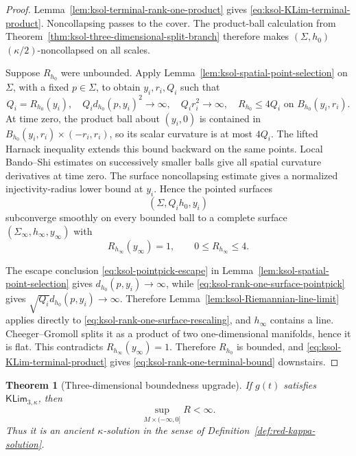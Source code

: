 \documentclass[10pt]{coll-l}
\newtheorem{theorem}{Theorem}[chapter]
\theoremstyle{definition}
\theoremstyle{remark}
\numberwithin{section}{chapter}
\numberwithin{equation}{chapter}
\begin{document}
\begin{proof}
Lemma~\ref{lem:ksol-terminal-rank-one-product} gives
\eqref{eq:ksol-KLim-terminal-product}.  Noncollapsing passes to the cover.
The product-ball
calculation from Theorem~\ref{thm:ksol-three-dimensional-split-branch}
therefore makes $(\Sigma,h_0)$ $(\kappa/2)$-noncollapsed on all scales.

Suppose $R_{h_0}$ were unbounded.  Apply
Lemma~\ref{lem:ksol-spatial-point-selection} on $\Sigma$, with a fixed
$p\in\Sigma$, to obtain $y_i,r_i,Q_i$ such that
\begin{equation}
 Q_i=R_{h_0}(y_i),\quad
 Q_i d_{h_0}(p,y_i)^2\to\infty,\quad
 Q_ir_i^2\to\infty,\quad
 R_{h_0}\leq4Q_i\text{ on }B_{h_0}(y_i,r_i).          \label{eq:ksol-rank-one-surface-pointpick}
\end{equation}
At time zero, the product ball about $(y_i,0)$ is contained in
$B_{h_0}(y_i,r_i)\times(-r_i,r_i)$, so its scalar curvature is at most
$4Q_i$.  The lifted Harnack inequality extends this bound backward on the
same points.  Local Bando--Shi estimates on successively smaller balls give
all spatial curvature derivatives at time zero.  The surface
noncollapsing estimate gives a normalized injectivity-radius lower bound at
$y_i$.  Hence the pointed surfaces
\begin{equation}
                       (\Sigma,Q_i h_0,y_i)            \label{eq:ksol-rank-one-surface-rescaling}
\end{equation}
subconverge smoothly on every bounded ball to a complete surface
$(\Sigma_\infty,h_\infty,y_\infty)$ with
\[
        R_{h_\infty}(y_\infty)=1,\qquad
        0\leq R_{h_\infty}\leq4.
\]

The escape conclusion \eqref{eq:ksol-pointpick-escape} in
Lemma~\ref{lem:ksol-spatial-point-selection} gives
$d_{h_0}(p,y_i)\to\infty$, while
\eqref{eq:ksol-rank-one-surface-pointpick} gives
$\sqrt{Q_i}d_{h_0}(p,y_i)\to\infty$.  Therefore
Lemma~\ref{lem:ksol-Riemannian-line-limit} applies directly to
\eqref{eq:ksol-rank-one-surface-rescaling}, and $h_\infty$ contains a
line.  Cheeger--Gromoll splits it as a product of two one-dimensional
manifolds, hence it is flat.  This contradicts
$R_{h_\infty}(y_\infty)=1$.  Therefore $R_{h_0}$ is bounded, and
\eqref{eq:ksol-KLim-terminal-product} gives
\eqref{eq:ksol-rank-one-terminal-bound} downstairs.
\end{proof}

\begin{theorem}[Three-dimensional boundedness upgrade]
\label{thm:ksol-three-dimensional-KLim-bounded}
If $g(t)$ satisfies $\mathsf{KLim}_{3,\kappa}$, then
\begin{equation}
                    \sup_{M\times(-\infty,0]}R<\infty. \label{eq:ksol-KLim3-global-bound}
\end{equation}
Thus it is an ancient $\kappa$-solution in the sense of
Definition~\ref{def:red-kappa-solution}.
\end{theorem}
\end{document}
